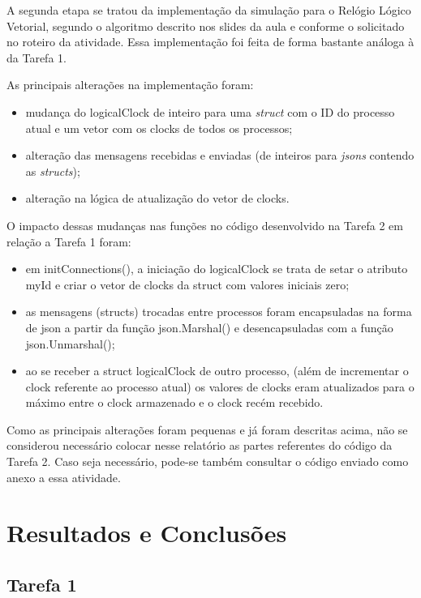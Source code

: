 \documentclass[conference]{IEEEtran}
\begin{document}
	A segunda etapa se tratou da implementação da simulação para o Relógio Lógico Vetorial, segundo o algoritmo descrito nos slides da aula e conforme o solicitado no roteiro da atividade. Essa implementação foi feita de forma bastante análoga à da Tarefa 1.
	
	As principais alterações na implementação foram:
\begin{itemize}
\item mudança do logicalClock de inteiro para uma \textit{struct} com o ID do processo atual e um vetor com os clocks de todos os processos;
\item alteração das mensagens recebidas e enviadas (de inteiros para \textit{jsons} contendo as \textit{structs});
\item alteração na lógica de atualização do vetor de clocks.
\end{itemize}

	O impacto dessas mudanças nas funções no código desenvolvido na Tarefa 2 em relação a Tarefa 1 foram:
	
\begin{itemize}
\item em initConnections(), a iniciação do logicalClock se trata de setar o atributo myId e criar o vetor de clocks da struct com valores iniciais zero;
\item as mensagens (structs) trocadas entre processos foram encapsuladas na forma de json a partir da função json.Marshal() e desencapsuladas com a função json.Unmarshal();
\item ao se receber a struct logicalClock de outro processo, (além de incrementar o clock referente ao processo atual) os valores de clocks eram atualizados para o máximo entre o clock armazenado e o clock recém recebido.
\end{itemize}

Como as principais alterações foram pequenas e já foram descritas acima, não se considerou necessário colocar nesse relatório as partes referentes do código da Tarefa 2. Caso seja necessário, pode-se também consultar o código enviado como anexo a essa atividade. 

\section{Resultados e Conclusões} \label{results}

\subsection{Tarefa 1}
\end{document}
